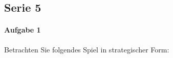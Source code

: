 \subsection{Serie 5}%
\label{sub:serie_5}

\paragraph{Aufgabe 1}%
\label{par:aufgabe_1}

Betrachten Sie folgendes Spiel in strategischer Form:

